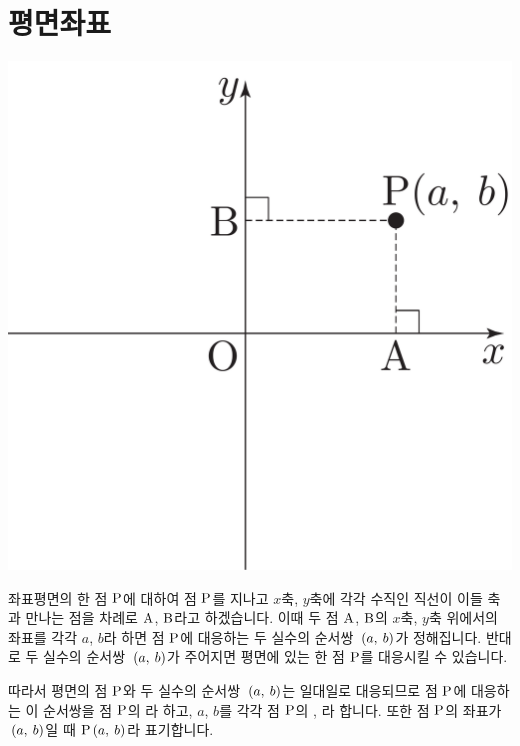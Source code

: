 \section{평면좌표}
\begin{center}
\includegraphics[scale=0.125]{pic0/pic143.pdf}
\end{center}좌표평면의 한 점 $\mrm{P}$에 대하여 점 $\mrm{P}$를 지나고 $x$축, $y$축에 각각 수직인 직선이 이들 축과 만나는 점을 차례로 $\mrm{A}$, $\mrm{B}$라고 하겠습니다. 이때 두 점 $\mrm{A}$, $\mrm{B}$의 $x$축, \mbox{$y$축} 위에서의 좌표를 각각 $a$, $b$라 하면
점 $\mrm{P}$에 대응하는 두 실수의 순서쌍 $\xy{a}{b}$가 정해집니다. 반대로 두 실수의 순서쌍 $\xy{a}{b}$가 주어지면 평면에 있는 한 점 $\mrm{P}$를 대응시킬 수 있습니다.

따라서 평면의 점 $\mrm{P}$와 두 실수의 순서쌍 $\xy{a}{b}$는 일대일로 대응되므로 점 $\mrm{P}$에 대응하는 이 순서쌍을 점 $\mrm{P}$의 라 하고, $a$, $b$를 각각 점 $\mrm{P}$의 , 라 합니다. 또한 점 $\mrm{P}$의 좌표가 $\xy{a}{b}$일 때 $\xy[P]{a}{b}$라 표기합니다.

\cleartorecto

